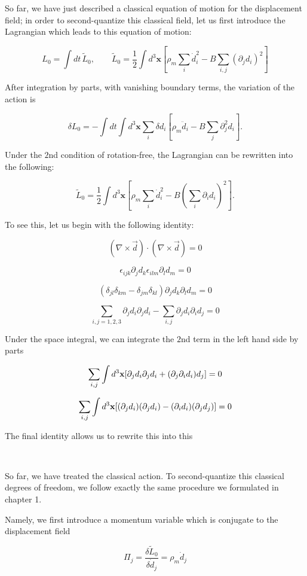 So far, we have just described a classical equation of motion for the displacement field; in order to second-quantize this classical field, let us first introduce the Lagrangian which leads to this equation of motion:

\[L_0 = \int dt\,\tilde L_0,\qquad
\tilde L_0 = \frac{1}{2}\int d^3\bm{x}\left[\rho_m\sum_i\dot d_i^2-B\sum_{i,j}(\partial_jd_i)^2\right]\]

After integration by parts, with vanishing boundary terms, the variation of the action is

\[\delta L_0 = -\int dt\int d^3\bm{x}\sum_i\delta d_i\left[\rho_m\ddot d_i-B\sum_j\partial_j^2d_i\right].\]

Under the $2$nd condition of rotation-free, the Lagrangian can be rewritten into the following:

\[\tilde L_0 = \frac{1}{2}\int d^3\bm{x}\left[\rho_m\sum_i\dot d_i^2-B\left(\sum_i\partial_id_i\right)^2\right].\]

To see this, let us begin with the following identity:

\[(\nabla\times\vec{d})\cdot(\nabla\times\vec{d}) = 0 \]

\[\epsilon_{ijk}\partial_j d_k\epsilon_{ilm}\partial_l d_m = 0 \]

\[(\delta_{jl}\delta_{km} - \delta_{jm}\delta_{kl})\partial_j d_k\partial_l d_m = 0 \]

\[\sum_{i,j = 1,2,3} \partial_j d_i \partial_j d_i - \sum_{i,j}\partial_j d_i \partial_i d_j = 0 \]

Under the space integral, we can integrate the $2$nd term in the left hand side by parts

\[\sum_{i,j}\int d^3{\bf x}[\partial_j d_i\partial_j d_i+(\partial_j\partial_i d_i)d_j] = 0 \]

\[\sum_{i,j}\int d^3{\bf x}[(\partial_j d_i)(\partial_j d_i) - (\partial_i d_i)(\partial_j d_j)] = 0 \]

The final identity allows us to rewrite this into this

\dotfill

\

So far, we have treated the classical action. To second-quantize this classical degrees of freedom, we follow exactly the same procedure we formulated in chapter 1.

Namely, we first introduce a momentum variable which is conjugate to the displacement field

\[\Pi_j = \frac{\delta \tilde L_0}{\delta \dot{d}_j} = \rho_m\dot{d}_j \]

